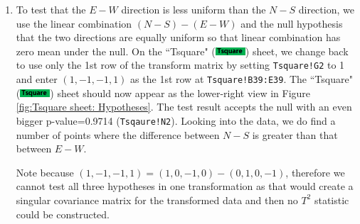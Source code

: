 \documentclass[article]{jss}
\numberwithin{equation}{subsection}
\newcommand{\shtTsquare}{``Tsquare" (\includegraphics[height=8pt, keepaspectratio=true]{img/TsquareSheetTab_png}) }
\begin{document}
\begin{enumerate}
        	\begin{figure}[!tbh]
        		\includegraphics[width=90pt,keepaspectratio=true]{img/Cov2Correl_PlotCov}
        		\vspace{-10pt}\centering\protect\caption{Cov2Correl sheet: Covariance plot of the transformed responses.}\label{fig:Cov2Correl_PlotCov}
        	\end{figure}
        	
        	
        	Now we see that the covariance is elongated along the positive sloped direction, making it possible that the mean vector (\texttt{0.857142857, 0.928571429}), displayed at range \texttt{Tsquare!L5:L6}, has a smaller Mahalanobis distance from the center than both its projections on the two standard basis coordinates. This is a version of the Stein paradox (\cite{SteinCM1956InadmissibilityoftheUsualEstima}, \cite{CasellaHwang2012}). In the case here it can be understood as that the two hypotheses mutually corroborate. The data has indicated that it is more natural to have $N=S$ and $E=W$ happening together than separately; it is rather strange to observe uniformity in only one of the directions but not in the other. The corroboration effect would not have been captured had we been testing only univariate procedures.
        	
        	
        	\item To test that the $E-W$ direction is less uniform than the $N-S$ direction, we use the linear combination $(N-S)-(E-W)$ and the null hypothesis that the two directions are equally uniform so that linear combination has zero mean under the null. On the \shtTsquare sheet, we change back to use only the 1st row of the transform matrix by setting \texttt{Tsquare!G2} to 1 and enter $(1,-1,-1,1)$ as the 1st row at \texttt{Tsquare!B39:E39}. The \shtTsquare sheet should now appear as the lower-right view in Figure \ref{fig:Tsquare sheet: Hypotheses}. The test result accepts the null with an even bigger p-value=0.9714 (\texttt{Tsqaure!N2}). Looking into the data, we do find a number of points where the difference between $N-S$ is greater than that between $E-W$.
        	
        	
        	Note because $(1,-1,-1,1) = (1,0,-1,0) - (0,1,0,-1)$, therefore we cannot test all three hypotheses in one transformation as that would create a singular covariance matrix for the transformed data and then no $T^2$ statistic could be constructed.
        	
        \end{enumerate}
        
\end{document}
